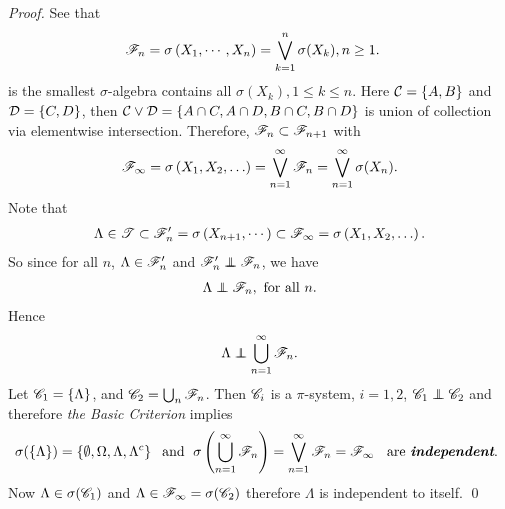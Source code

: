 \documentclass[11pt]{article}
\begin{document}
\begin{itemize}
\begin{proof}
See that \begin{align*}
{\mathscr F}_{n} &= \sigma\left(X_{1}, \cdots, X_{n}\right)= \bigvee_{k=1}^{n}\sigma(X_{k}), n\ge 1.
\end{align*}
is the smallest $\sigma$-algebra contains all $\sigma(X_{k}), 1\le k\le n$. Here ${\mathcal C} = \left\{A, B\right\}$ and ${\mathcal D}=\left\{C, D\right\}$, then ${\mathcal C} \vee {\mathcal D} = \left\{A\cap C, A\cap D, B\cap C, B\cap D\right\}$ is union of collection via elementwise intersection. Therefore, ${\mathscr F}_{n}\subset {\mathscr F}_{n+1}$ with 
\begin{align*}
{\mathscr F}_{\infty}= \sigma\left(X_{1},X_2, \ldots\right)= \bigvee_{n=1}^{\infty} {\mathscr F}_{n} = \bigvee_{n=1}^{\infty}\sigma(X_n).
\end{align*}
Note that 
\begin{align*}
\Lambda\in {\mathscr T}\subset {\mathscr F}_{n}' = \sigma\left(X_{n+1}, \cdots\right)  \subset {\mathscr F}_{\infty} =  \sigma\left(X_{1},X_2, \ldots\right).
\end{align*}
 So since for all $n$, $\Lambda\in {\mathscr F}_{n}'$ and  $\srF_{n}'\indep \srF_{n} $, we have 
\begin{align*}
\Lambda \indep \srF_{n}, \text{ for all $n$.}
\end{align*} Hence 
\begin{align*}
\Lambda \indep \bigcup_{n=1}^{\infty}\srF_{n}.
\end{align*}  
Let ${\mathscr C}_1 =\left\{\Lambda\right\}$, and ${\mathscr C}_2 = \bigcup_{n}{\mathscr F}_{n}$. Then ${\mathscr C}_i$ is a $\pi$-system, $i = 1, 2$, $\srC_1 \indep \srC_2$ and
therefore \emph{the Basic Criterion} implies 
\begin{align*}
\sigma(\left\{\Lambda\right\}) = \left\{\emptyset, \Omega, \Lambda, \Lambda^{c}\right\} \;\text{ and }\; \sigma\left(\bigcup_{n=1}^{\infty}{\mathscr F}_{n}\right)=  \bigvee_{n=1}^{\infty}{\mathscr F}_{n}= {\mathscr F}_{\infty}\;\; \text{ are \emph{\textbf{independent}}. }
\end{align*}
Now $\Lambda\in \sigma({\mathscr C}_1)$ and $\Lambda\in {\mathscr F}_{\infty} = \sigma({\mathscr C}_2)$ therefore $\Lambda$ is independent to itself. \qed
\end{proof}



\end{itemize}
\end{document}
